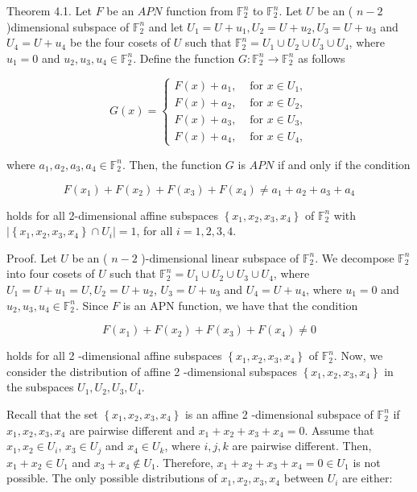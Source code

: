 \documentclass[10pt]{article}
\begin{document}
Theorem 4.1. Let $F$ be an $A P N$ function from $\mathbb{F}_{2}^{n}$ to $\mathbb{F}_{2}^{n}$. Let $U$ be an ( $n-2$ )dimensional subspace of $\mathbb{F}_{2}^{n}$ and let $U_{1}=U+u_{1}, U_{2}=U+u_{2}, U_{3}=U+u_{3}$ and $U_{4}=U+u_{4}$ be the four cosets of $U$ such that $\mathbb{F}_{2}^{n}=U_{1} \cup U_{2} \cup U_{3} \cup U_{4}$, where $u_{1}=0$ and $u_{2}, u_{3}, u_{4} \in \mathbb{F}_{2}^{n}$. Define the function $G: \mathbb{F}_{2}^{n} \rightarrow \mathbb{F}_{2}^{n}$ as follows

\[
G(x)= \begin{cases}F(x)+a_{1}, & \text { for } x \in U_{1},  \tag{4.1}\\ F(x)+a_{2}, & \text { for } x \in U_{2}, \\ F(x)+a_{3}, & \text { for } x \in U_{3}, \\ F(x)+a_{4}, & \text { for } x \in U_{4},\end{cases}
\]

where $a_{1}, a_{2}, a_{3}, a_{4} \in \mathbb{F}_{2}^{n}$. Then, the function $G$ is $A P N$ if and only if the condition

$$
F\left(x_{1}\right)+F\left(x_{2}\right)+F\left(x_{3}\right)+F\left(x_{4}\right) \neq a_{1}+a_{2}+a_{3}+a_{4}
$$

holds for all 2-dimensional affine subspaces $\left\{x_{1}, x_{2}, x_{3}, x_{4}\right\}$ of $\mathbb{F}_{2}^{n}$ with $\mid\left\{x_{1}, x_{2}, x_{3}, x_{4}\right\} \cap U_{i} \mid=1$, for all $i=1,2,3,4$.

Proof. Let $U$ be an ( $n-2$ )-dimensional linear subspace of $\mathbb{F}_{2}^{n}$. We decompose $\mathbb{F}_{2}^{n}$ into four cosets of $U$ such that $\mathbb{F}_{2}^{n}=U_{1} \cup U_{2} \cup U_{3} \cup U_{4}$, where $U_{1}=U+u_{1}=U, U_{2}=U+u_{2}$, $U_{3}=U+u_{3}$ and $U_{4}=U+u_{4}$, where $u_{1}=0$ and $u_{2}, u_{3}, u_{4} \in \mathbb{F}_{2}^{n}$. Since $F$ is an APN function, we have that the condition

$$
F\left(x_{1}\right)+F\left(x_{2}\right)+F\left(x_{3}\right)+F\left(x_{4}\right) \neq 0
$$

holds for all 2 -dimensional affine subspaces $\left\{x_{1}, x_{2}, x_{3}, x_{4}\right\}$ of $\mathbb{F}_{2}^{n}$. Now, we consider the distribution of affine 2 -dimensional subspaces $\left\{x_{1}, x_{2}, x_{3}, x_{4}\right\}$ in the subspaces $U_{1}, U_{2}, U_{3}, U_{4}$.

Recall that the set $\left\{x_{1}, x_{2}, x_{3}, x_{4}\right\}$ is an affine 2 -dimensional subspace of $\mathbb{F}_{2}^{n}$ if $x_{1}, x_{2}, x_{3}, x_{4}$ are pairwise different and $x_{1}+x_{2}+x_{3}+x_{4}=0$. Assume that $x_{1}, x_{2} \in U_{i}$, $x_{3} \in U_{j}$ and $x_{4} \in U_{k}$, where $i, j, k$ are pairwise different. Then, $x_{1}+x_{2} \in U_{1}$ and $x_{3}+x_{4} \notin U_{1}$. Therefore, $x_{1}+x_{2}+x_{3}+x_{4}=0 \in U_{1}$ is not possible. The only possible distributions of $x_{1}, x_{2}, x_{3}, x_{4}$ between $U_{i}$ are either:
\end{document}
